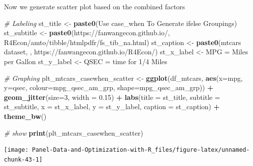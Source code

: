 \documentclass[
]{book}
\newenvironment{Shaded}{\begin{snugshade}}{\end{snugshade}}
\newcommand{\CommentTok}[1]{\textcolor[rgb]{0.56,0.35,0.01}{\textit{#1}}}
\newcommand{\DataTypeTok}[1]{\textcolor[rgb]{0.13,0.29,0.53}{#1}}
\newcommand{\DecValTok}[1]{\textcolor[rgb]{0.00,0.00,0.81}{#1}}
\newcommand{\FloatTok}[1]{\textcolor[rgb]{0.00,0.00,0.81}{#1}}
\newcommand{\KeywordTok}[1]{\textcolor[rgb]{0.13,0.29,0.53}{\textbf{#1}}}
\newcommand{\NormalTok}[1]{#1}
\newcommand{\OperatorTok}[1]{\textcolor[rgb]{0.81,0.36,0.00}{\textbf{#1}}}
\newcommand{\StringTok}[1]{\textcolor[rgb]{0.31,0.60,0.02}{#1}}
\begin{document}
Now we generate scatter plot based on the combined factors

\begin{Shaded}
\begin{Highlighting}[]
\CommentTok{\# Labeling}
\NormalTok{st\_title \textless{}{-}}\StringTok{ }\KeywordTok{paste0}\NormalTok{(}\StringTok{\textquotesingle{}Use case\_when To Generate ifelse Groupings\textquotesingle{}}\NormalTok{)}
\NormalTok{st\_subtitle \textless{}{-}}\StringTok{ }\KeywordTok{paste0}\NormalTok{(}\StringTok{\textquotesingle{}https://fanwangecon.github.io/\textquotesingle{}}\NormalTok{,}
                      \StringTok{\textquotesingle{}R4Econ/amto/tibble/htmlpdfr/fs\_tib\_na.html\textquotesingle{}}\NormalTok{)}
\NormalTok{st\_caption \textless{}{-}}\StringTok{ }\KeywordTok{paste0}\NormalTok{(}\StringTok{\textquotesingle{}mtcars dataset, \textquotesingle{}}\NormalTok{,}
                     \StringTok{\textquotesingle{}https://fanwangecon.github.io/R4Econ/\textquotesingle{}}\NormalTok{)}
\NormalTok{st\_x\_label \textless{}{-}}\StringTok{ \textquotesingle{}MPG = Miles per Gallon\textquotesingle{}}
\NormalTok{st\_y\_label \textless{}{-}}\StringTok{ \textquotesingle{}QSEC = time for 1/4 Miles\textquotesingle{}}

\CommentTok{\# Graphing}
\NormalTok{plt\_mtcars\_casewhen\_scatter \textless{}{-}}\StringTok{ }
\StringTok{  }\KeywordTok{ggplot}\NormalTok{(df\_mtcars, }
         \KeywordTok{aes}\NormalTok{(}\DataTypeTok{x=}\NormalTok{mpg, }\DataTypeTok{y=}\NormalTok{qsec, }
             \DataTypeTok{colour=}\NormalTok{mpg\_qsec\_am\_grp, }
             \DataTypeTok{shape=}\NormalTok{mpg\_qsec\_am\_grp)) }\OperatorTok{+}
\StringTok{  }\KeywordTok{geom\_jitter}\NormalTok{(}\DataTypeTok{size=}\DecValTok{3}\NormalTok{, }\DataTypeTok{width =} \FloatTok{0.15}\NormalTok{) }\OperatorTok{+}
\StringTok{  }\KeywordTok{labs}\NormalTok{(}\DataTypeTok{title =}\NormalTok{ st\_title, }\DataTypeTok{subtitle =}\NormalTok{ st\_subtitle,}
       \DataTypeTok{x =}\NormalTok{ st\_x\_label, }\DataTypeTok{y =}\NormalTok{ st\_y\_label, }\DataTypeTok{caption =}\NormalTok{ st\_caption) }\OperatorTok{+}
\StringTok{  }\KeywordTok{theme\_bw}\NormalTok{()}

\CommentTok{\# show}
\KeywordTok{print}\NormalTok{(plt\_mtcars\_casewhen\_scatter)}
\end{Highlighting}
\end{Shaded}

\begin{center}\texttt{[image: Panel-Data-and-Optimization-with-R\_files/figure-latex/unnamed-chunk-43-1]} \end{center}
\end{document}
